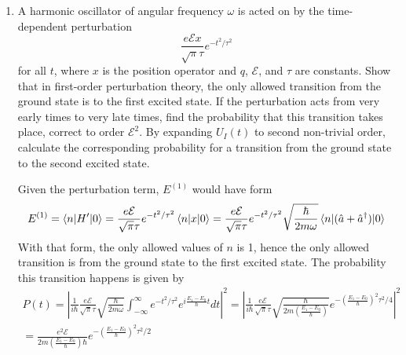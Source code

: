 \documentclass[10pt,letterpaper]{article}
\begin{document}
\begin{enumerate}
\item A harmonic oscillator of angular frequency $\omega$ is acted on by the time-dependent perturbation
$$\frac{e\mathcal{E}x}{\sqrt{\pi}\tau}e^{-t^{2}/\tau^{2}}$$
for all $t$, where $x$ is the position operator and $q$, $\mathcal{E}$, and $\tau$ are constants. Show that in first-order perturbation theory, the only allowed transition from the ground state is to the first excited state. If the perturbation acts from very early times to very late times, find the probability that this transition takes place, correct to order $\mathcal{E}^{2}$. By expanding $U_{I}(t)$ to second non-trivial order, calculate the corresponding probability for a transition from the ground state to the second excited state.

\color{violet}
Given the perturbation term, $E^{(1)}$ would have form
\begin{gather*}
E^{(1)} = \braket{n | H' | 0} = \frac{e\mathcal{E}}{\sqrt{\pi}\tau}e^{-t^{2}/\tau^{2}} \braket{n | x | 0} = \frac{e\mathcal{E}}{\sqrt{\pi}\tau}e^{-t^{2}/\tau^{2}} \sqrt{\frac{\hbar}{2m\omega}} \braket{n | (\hat{a} + \hat{a}^{\dagger}) | 0}
\end{gather*}
With that form, the only allowed values of $n$ is 1, hence the only allowed transition is from the ground state to the first excited state. The probability this transition happens is given by
\begin{gather*}
P(t) = \left\vert \frac{1}{i\hbar} \frac{e\mathcal{E}}{\sqrt{\pi}\tau} \sqrt{\frac{\hbar}{2m\omega}} \int_{-\infty}^{\infty} e^{-t^{2}/\tau^{2}}e^{i \frac{E_{1} - E_{0}}{\hbar} t} dt \right\vert^{2} = \left\vert \frac{1}{i\hbar} \frac{e\mathcal{E}}{\sqrt{\pi}\tau} \sqrt{\frac{\hbar}{2m\left( \frac{E_{1} - E_{0}}{\hbar} \right)}} e^{-\left( \frac{E_{1} - E_{0}}{\hbar} \right)^{2}\tau^{2}/4} \right\vert^{2} \\
= \frac{e^{2}\mathcal{E}}{2m\left( \frac{E_{1} - E_{0}}{\hbar} \right)\hbar} e^{-\left( \frac{E_{1} - E_{0}}{\hbar} \right)^{2}\tau^{2}/2}
\end{gather*}
\color{black}

\end{enumerate}
\end{document}
